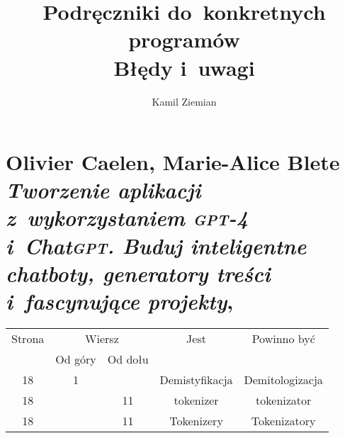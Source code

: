 \documentclass[a4paper,11pt]{article}
\title{Podręczniki do~konkretnych programów \\
  {\Large Błędy i~uwagi}}
\author{Kamil Ziemian}
\numberwithin{equation}{section}
\begin{document}





\maketitle





\section{Olivier Caelen, Marie-Alice Blete
  \textit{Tworzenie aplikacji z~wykorzystaniem
    \textsc{gpt}-4 i~Chat\textsc{gpt}. Buduj inteligentne
    chatboty, generatory treści i~fascynujące projekty},
  \parencite{Caelen-Blete-Tworzenie-aplikacji-z-wykorzystaniemi-ETC-Pub-2024}}

\label{sec:Caelen-Blete-Tworzenie-aplikacji-ETC}






\begin{center}

  \begin{tabular}{|c|c|c|c|c|}
    \hline
    Strona & \multicolumn{2}{c|}{Wiersz} & Jest
                              & Powinno być \\ \cline{2-3}
    & Od góry & Od dołu & & \\
    \hline
    18 & 1 & & Demistyfikacja & Demitologizacja \\
    18 & & 11 & tokenizer & tokenizator \\
    18 & & 11 & Tokenizery & Tokenizatory \\
    \hline
  \end{tabular}

\end{center}

\VerSpaceTwo
\end{document}
